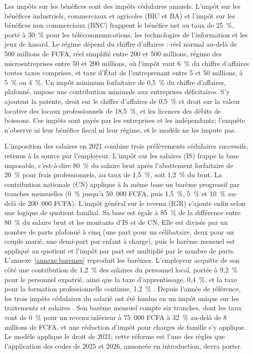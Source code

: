 \documentclass[11pt,a4paper]{article}
\begin{document}
Les impôts sur les bénéfices sont des impôts cédulaires annuels. L'impôt sur
les bénéfices industriels, commerciaux et agricoles (BIC et BA) et l'impôt sur
les bénéfices non commerciaux (BNC) frappent le bénéfice net au taux de 25~\%,
porté à 30~\% pour les télécommunications, les technologies de l'information et
les jeux de hasard. Le régime dépend du chiffre d'affaires : réel normal
au-delà de 500 millions de FCFA, réel simplifié entre 200 et 500 millions,
régime des microentreprises entre 50 et 200 millions, où l'impôt vaut 6~\% du
chiffre d'affaires toutes taxes comprises, et taxe d'État de l'entreprenant
entre 5 et 50 millions, à 5~\% ou 4~\%. Un impôt minimum forfaitaire de 0,5~\%
du chiffre d'affaires, plafonné, impose une contribution minimale aux
entreprises déficitaires. S'y ajoutent la patente, droit sur le chiffre d'affaires de 0,5~\%
et droit sur la valeur locative des locaux professionnels de 18,5~\%, et les
licences des débits de boissons. Ces impôts sont payés par les entreprises et
les indépendants; l'enquête n'observe ni leur bénéfice fiscal ni leur régime,
et le modèle ne les impute pas.

L'imposition des salaires en 2021 combine trois prélèvements cédulaires
successifs, retenus à la source par l'employeur. L'impôt sur les salaires (IS)
frappe la base imposable, c'est-à-dire 80~\% du salaire brut après
l'abattement forfaitaire de 20~\% pour frais professionnels, au taux de
1,5~\%, soit 1,2~\% du brut. La contribution nationale (CN) applique à la même
base un barème progressif par tranches mensuelles (0~\% jusqu'à 50~000 FCFA,
puis 1,5~\%, 5~\% et 10~\% au-delà de 200~000 FCFA). L'impôt général sur le
revenu (IGR) s'ajoute enfin selon une logique de quotient familial. Sa base est
égale à 85~\% de la différence entre 80~\% du salaire brut et les montants d'IS
et de CN. Elle est divisée par un nombre de parts plafonné à cinq (une part pour
un célibataire, deux pour un couple marié, une demi-part par enfant à charge),
puis le barème mensuel est appliqué au quotient et l'impôt par part est
multiplié par le nombre de parts. L'annexe~\ref{annexe:baremes} reproduit les
barèmes. L'employeur acquitte de son côté une contribution de 1,2~\% des
salaires du personnel local, portée à 9,2~\% pour le personnel expatrié, ainsi
que la taxe d'apprentissage, 0,4~\%, et la taxe pour la formation
professionnelle continue, 1,2~\% \citep{dgi2025impots}. Depuis l'année de
référence, les trois impôts cédulaires du salarié ont été fondus en un impôt
unique sur les traitements et salaires \citep{dgi2025impots}. Son barème
mensuel compte six tranches, dont les taux vont de 0~\% pour un revenu
inférieur à 75~000 FCFA à 32~\% au-delà de 8 millions de FCFA, et une réduction
d'impôt pour charges de famille s'y applique. Le modèle applique le droit de
2021; cette réforme est l'une des règles que l'application des codes de 2025 et
2026, annoncée en introduction, devra porter.
\end{document}
